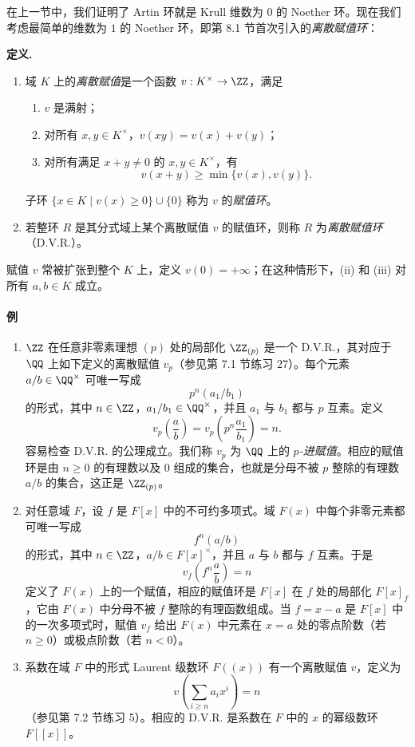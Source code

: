 在上一节中，我们证明了 Artin 环就是 Krull 维数为 $0$ 的 Noether 环。现在我们考虑最简单的维数为 $1$ 的 Noether 环，即第 8.1 节首次引入的\emph{离散赋值环}：

\noindent\textbf{定义.}
\begin{enumerate}[label=(\arabic*)]
  \item 域 $K$ 上的\emph{离散赋值}是一个函数 $v:K^\times\to\ZZ$，满足
  \begin{enumerate}[label=(\roman*)]
    \item $v$ 是满射；
    \item 对所有 $x,y\in K^\times$，$v(xy)=v(x)+v(y)$；
    \item 对所有满足 $x+y\neq0$ 的 $x,y\in K^\times$，有
    \[
      v(x+y)\geq\min\{v(x),v(y)\}.
    \]
  \end{enumerate}
  子环 $\{x\in K\mid v(x)\geq0\}\cup\{0\}$ 称为 $v$ 的\emph{赋值环}。
  \item 若整环 $R$ 是其分式域上某个离散赋值 $v$ 的赋值环，则称 $R$ 为\emph{离散赋值环}（D.V.R.）。
\end{enumerate}

赋值 $v$ 常被扩张到整个 $K$ 上，定义 $v(0)=+\infty$；在这种情形下，(ii) 和 (iii) 对所有 $a,b\in K$ 成立。

\paragraph{例}
\begin{enumerate}[label=(\arabic*)]
  \item $\ZZ$ 在任意非零素理想 $(p)$ 处的局部化 $\ZZ_{(p)}$ 是一个 D.V.R.，其对应于 $\QQ$ 上如下定义的离散赋值 $v_p$（参见第 7.1 节练习 27）。每个元素 $a/b\in\QQ^\times$ 可唯一写成
  \[
    p^n(a_1/b_1)
  \]
  的形式，其中 $n\in\ZZ$，$a_1/b_1\in\QQ^\times$，并且 $a_1$ 与 $b_1$ 都与 $p$ 互素。定义
  \[
    v_p\left(\frac ab\right)=v_p\left(p^n\frac{a_1}{b_1}\right)=n.
  \]
  容易检查 D.V.R. 的公理成立。我们称 $v_p$ 为 $\QQ$ 上的 \emph{$p$-进赋值}。相应的赋值环是由 $n\geq0$ 的有理数以及 $0$ 组成的集合，也就是分母不被 $p$ 整除的有理数 $a/b$ 的集合，这正是 $\ZZ_{(p)}$。

  \item 对任意域 $F$，设 $f$ 是 $F[x]$ 中的不可约多项式。域 $F(x)$ 中每个非零元素都可唯一写成
  \[
    f^n(a/b)
  \]
  的形式，其中 $n\in\ZZ$，$a/b\in F[x]^\times$，并且 $a$ 与 $b$ 都与 $f$ 互素。于是
  \[
    v_f\left(f^n\frac ab\right)=n
  \]
  定义了 $F(x)$ 上的一个赋值，相应的赋值环是 $F[x]$ 在 $f$ 处的局部化 $F[x]_f$，它由 $F(x)$ 中分母不被 $f$ 整除的有理函数组成。当 $f=x-a$ 是 $F[x]$ 中的一次多项式时，赋值 $v_f$ 给出 $F(x)$ 中元素在 $x=a$ 处的零点阶数（若 $n\geq0$）或极点阶数（若 $n<0$）。

  \item 系数在域 $F$ 中的形式 Laurent 级数环 $F((x))$ 有一个离散赋值 $v$，定义为
  \[
    v\left(\sum_{i\geq n}a_ix^i\right)=n
  \]
  （参见第 7.2 节练习 5）。相应的 D.V.R. 是系数在 $F$ 中的 $x$ 的幂级数环 $F[[x]]$。
\end{enumerate}

